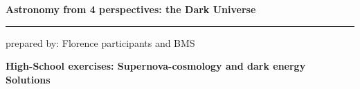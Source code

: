 \documentclass[a4paper,12pt]{article}
\newcommand{\HRule}{\rule{\linewidth}{0.3mm}}
\begin{document}
	\pagestyle{empty}
	
	\begin{center}
		\LARGE \textbf{Astronomy from 4 perspectives: the Dark Universe}
		\HRule
	\end{center}
	\begin{flushright}
		prepared by: Florence participants and BMS
	\end{flushright}
	\begin{center}
		{\Large \textbf{High-School exercises: Supernova-cosmology and dark energy}}\\
		\vspace*{2mm}
		{\Large \textbf{Solutions}}
		
	\end{center}
	\vspace{5mm}
	
\end{document}
